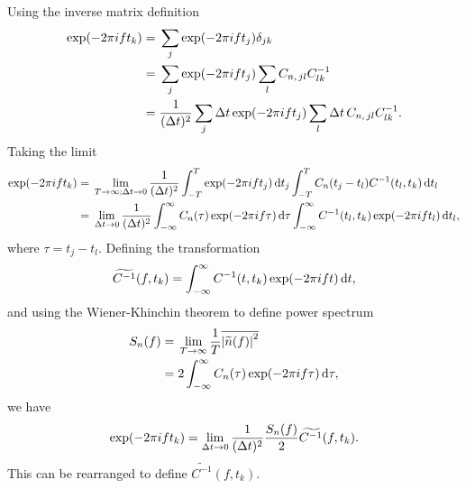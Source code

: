 Using the inverse matrix definition
\begin{align}
\exp(-2\pi i f t_k) = {} & \sum_j \exp(-2\pi ift_j) \delta_{jk} \nonumber \\
 = {} & \sum_j \exp(-2\pi ift_j) \sum_l C_{n,\,jl}C^{-1}_{lk} \nonumber \\
 = {} & \recip{(\upDelta t)^2} \sum_j \upDelta t \exp(-2\pi ift_j) \sum_l \upDelta t \, C_{n,\,jl}C^{-1}_{lk}.
\end{align}
Taking the limit
\begin{align}
\exp(-2\pi i f t_k) = {} & \lim_{T \rightarrow \infty;\upDelta t \rightarrow 0} \recip{(\upDelta t)^2} \intd{-T}{T}{\exp(-2\pi ift_j)}{t_j} \intd{-T}{T}{C_n(t_j-t_l)C^{-1}(t_l,t_k)}{t_l} \nonumber \\
 = {} & \lim_{\upDelta t \rightarrow 0} \recip{(\upDelta t)^2} \intd{-\infty}{\infty}{C_n(\tau)\exp(-2\pi if\tau)}{\tau} \intd{-\infty}{\infty}{C^{-1}(t_l,t_k)\exp(-2\pi if t_l)}{t_l},
\end{align}
where $\tau = t_j - t_l$. Defining the transformation
\begin{equation}
\widetilde{C^{-1}}(f,t_k) = \int_{-\infty}^{\infty}{C^{-1}(t,t_k)\exp(-2\pi if t)}\,\mathrm{d}{t},
\end{equation}
and using the Wiener-Khinchin theorem to define power spectrum
\begin{align}
S_n(f) = {} & \lim_{T \rightarrow \infty} \frac{1}{T} \overline{\left|\widetilde{n}(f)\right|^2} \\
 = {} & 2 \int_{-\infty}^{\infty}{C_n(\tau)\exp(-2\pi i f\tau)}\,\mathrm{d}{\tau},
\end{align}
we have
\begin{equation}
\exp(-2\pi i f t_k) = \lim_{\upDelta t \rightarrow 0} \recip{(\upDelta t)^2} \frac{S_n(f)}{2} \widetilde{C^{-1}}(f,t_k).
\end{equation}
This can be rearranged to define $\widetilde{C^{-1}}(f,t_k)$.

